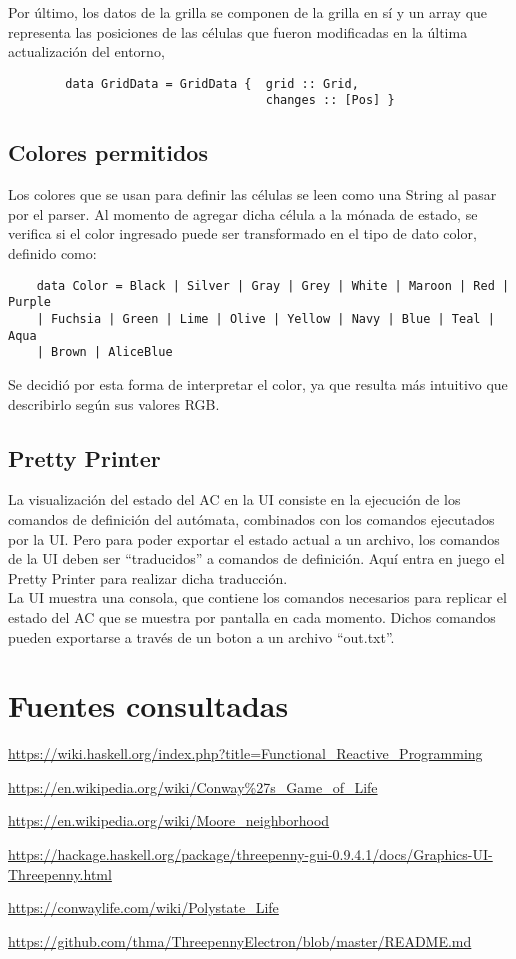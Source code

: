 \documentclass[fleqn,a4paper,11pt]{article}
\theoremstyle{mytheor}
\begin{document}
    Por último, los datos de la grilla se componen de la grilla en sí y un array que representa las posiciones de las células que fueron modificadas en la última actualización del entorno,
    \begin{verbatim}
        data GridData = GridData {  grid :: Grid,
                                    changes :: [Pos] }
    \end{verbatim}


    \subsection{Colores permitidos}\label{cap:Colores}
Los colores que se usan para definir las células se leen como una String al pasar por el parser. Al momento de agregar dicha célula a la mónada de estado, se verifica si el color ingresado puede ser transformado en el tipo de dato color, definido como:
\begin{verbatim}
    data Color = Black | Silver | Gray | Grey | White | Maroon | Red | Purple 
    | Fuchsia | Green | Lime | Olive | Yellow | Navy | Blue | Teal | Aqua 
    | Brown | AliceBlue
\end{verbatim}
Se decidió por esta forma de interpretar el color, ya que resulta más intuitivo que describirlo según sus valores RGB.

    \subsection{Pretty Printer}
La visualización del estado del AC en la UI consiste en la ejecución de los comandos de definición del autómata, combinados con los comandos ejecutados por la UI. Pero para poder exportar el estado actual a un archivo, los comandos de la UI deben ser ``traducidos'' a comandos de definición. Aquí entra en juego el Pretty Printer para realizar dicha traducción.\\
La UI muestra una consola, que contiene los comandos necesarios para replicar el estado del AC que se muestra por pantalla en cada momento. Dichos comandos pueden exportarse a través de un boton a un archivo ``out.txt''.

\section{Fuentes consultadas}

\url{https://wiki.haskell.org/index.php?title=Functional_Reactive_Programming}

\url{https://en.wikipedia.org/wiki/Conway%27s_Game_of_Life}

\url{https://en.wikipedia.org/wiki/Moore_neighborhood}

\url{https://hackage.haskell.org/package/threepenny-gui-0.9.4.1/docs/Graphics-UI-Threepenny.html}

\url{https://conwaylife.com/wiki/Polystate_Life}

\url{https://github.com/thma/ThreepennyElectron/blob/master/README.md}
\end{document}
